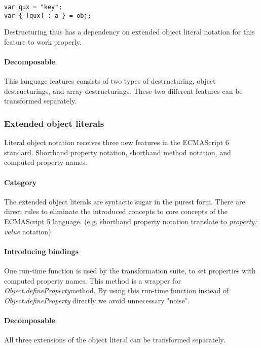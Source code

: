 \begin{lstlisting}
var qux = "key";
var { [qux] : a } = obj;
\end{lstlisting}

Destructuring thus has a dependency on extended object literal notation for this feature to work properly.

\paragraph{Decomposable}
This language features consists of two types of destructuring, object destructurings, and array destructurings. These two different features can be transformed separately. 

\subsubsection{Extended object literals} \label{object-literals}
Literal object notation receives three new features in the ECMAScript 6 standard\cite[12.2.5]{SpecJS}. Shorthand property notation, shorthand method notation, and computed property names.

\paragraph{Category}
The extended object literals are syntactic sugar in the purest form. There are direct rules to eliminate the introduced concepts to core concepts of the ECMAScript 5 language. (e.g. shorthand property notation translate to \textit{property: value} notation)

\paragraph{Introducing bindings}
One run-time function is used by the transformation suite, to set properties with computed property names. This method is a wrapper for \textit{Object.defineProperty}\footnotemark method. By using this run-time function instead of \textit{Object.defineProperty} directly we avoid unnecessary "noise".

\paragraph{Decomposable}
All three extensions of the object literal can be transformed separately. 

